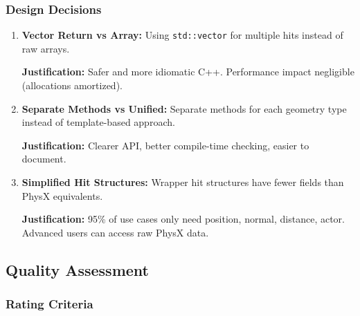 \subsubsection{Design Decisions}

\begin{enumerate}
    \item \textbf{Vector Return vs Array:} Using \texttt{std::vector} for multiple hits instead of raw arrays.

    \textbf{Justification:} Safer and more idiomatic C++. Performance impact negligible (allocations amortized).

    \item \textbf{Separate Methods vs Unified:} Separate methods for each geometry type instead of template-based approach.

    \textbf{Justification:} Clearer API, better compile-time checking, easier to document.

    \item \textbf{Simplified Hit Structures:} Wrapper hit structures have fewer fields than PhysX equivalents.

    \textbf{Justification:} 95\% of use cases only need position, normal, distance, actor. Advanced users can access raw PhysX data.
\end{enumerate}


\subsection{Quality Assessment}

\subsubsection{Rating Criteria}

